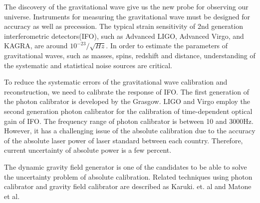 \documentclass[12pt]{iopart}
\begin{document}
The discovery of the gravitational wave give us the new probe for observing our universe. 
Instruments for measuring the gravitational wave must be designed for accuracy as well as precession.
The typical strain sensitivity of 2nd generation interferometric detectors(IFO), such as Advanced LIGO, Advanced Virgo, and KAGRA, are around $10^{-23}/\sqrt{Hz}$. In order to estimate the parameters of gravitational waves, such as masses, spins, redshift and distance, understanding of the systematic and statistical noise sources are critical.

To reduce the systematic errors of the gravitational wave calibration and reconstruction, we need to calibrate the response of IFO. The first generation of the photon calibrator is developed by the Grasgow. LIGO and Virgo employ the second generation photon calibrator for the calibration of time-dependent optical gain of IFO.  The frequency range of photon calibrator is between 10 and 3000Hz.  However, it has a challenging issue of the absolute calibration due to the accuracy of the absolute laser power of laser standard between each country. Therefore, current uncertainty of absolute power is a few percent.

The dynamic gravity field generator is one of the candidates to be able to solve the uncertainty problem of absolute calibration. Related techniques using photon calibrator and gravity field calibrator are described as Karuki. et. al and Matone et al.
\end{document}
